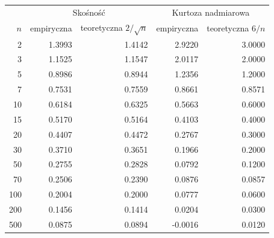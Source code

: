 \begin{tabular}{r|rr|rr}
\toprule
 & \multicolumn{2}{c|}{Skośność} & \multicolumn{2}{c}{Kurtoza nadmiarowa} \\
$n$ & empiryczna & teoretyczna $2/\sqrt{n}$ & empiryczna & teoretyczna $6/n$ \\
\midrule
2 & 1.3993 & 1.4142 & 2.9220 & 3.0000 \\
3 & 1.1525 & 1.1547 & 2.0117 & 2.0000 \\
5 & 0.8986 & 0.8944 & 1.2356 & 1.2000 \\
7 & 0.7531 & 0.7559 & 0.8661 & 0.8571 \\
10 & 0.6184 & 0.6325 & 0.5663 & 0.6000 \\
15 & 0.5170 & 0.5164 & 0.4103 & 0.4000 \\
20 & 0.4407 & 0.4472 & 0.2767 & 0.3000 \\
30 & 0.3710 & 0.3651 & 0.1966 & 0.2000 \\
50 & 0.2755 & 0.2828 & 0.0792 & 0.1200 \\
70 & 0.2506 & 0.2390 & 0.0876 & 0.0857 \\
100 & 0.2004 & 0.2000 & 0.0777 & 0.0600 \\
200 & 0.1456 & 0.1414 & 0.0204 & 0.0300 \\
500 & 0.0875 & 0.0894 & -0.0016 & 0.0120 \\
\bottomrule
\end{tabular}
